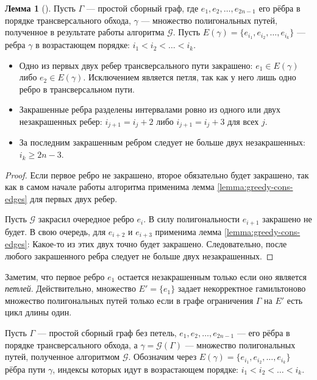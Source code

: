 \documentclass{article}
\theoremstyle{definition}
\newtheorem{lemma}[theorem]{Лемма}
\newcommand{\G}{\mathcal{G}}
\begin{document}
\begin{lemma}[\cite{MaksaevPreprint}]
    Пусть $\Gamma$ — простой сборный граф, где $e_1,e_2,\ldots,e_{2n - 1}$ его рёбра в порядке трансверсального обхода, $\gamma$ — множество полигональных путей, полученное в результате работы алгоритма $\G$. Пусть $E(\gamma) = \{e_{i_1}, e_{i_2},\ldots,e_{i_k}\}$ — ребра $\gamma$ в возрастающем порядке: $i_1 < i_2 <\ldots<i_k$.
    \begin{itemize}
        \item Одно из первых двух ребер трансверсального пути закрашено: $e_1 \in E(\gamma)$ либо $e_2 \in E(\gamma)$. Исключением является петля, так как у него лишь одно ребро в трансверсальном пути.
        \item Закрашенные ребра разделены интервалами ровно из одного или двух незакрашенных ребер: $i_{j + 1} = i_j + 2$ либо $i_{j + 1} = i_j + 3$ для всех $j$.
        \item За последним закрашенным ребром следует не больше двух незакрашенных: $i_k \geq 2n - 3$.
    \end{itemize}
\end{lemma}

\begin{proof}
    Если первое ребро не закрашено, второе обязательно будет закрашено, так как в самом начале работы алгоритма применима лемма \ref{lemma:greedy-cons-edges} для первых двух ребер. 
    
    Пусть $\G$ закрасил очередное ребро $e_i$. В силу полигональности $e_{i + 1}$ закрашено не будет. В свою очередь, для $e_{i + 2}$ и $e_{i + 3}$ применима лемма \ref{lemma:greedy-cons-edges}: Какое-то из этих двух точно будет закрашено. Следовательно, после любого закрашенного ребра следует не больше двух незакрашенных.
\end{proof}

 Заметим, что первое ребро $e_1$ остается незакрашенным только если оно является \emph{петлей}. Действительно, множество $E' = \{e_1\}$ задает некорректное гамильтоново множество полигональных путей только если в графе ограничения $\Gamma$ на $E'$ есть цикл длины один. 

Пусть $\Gamma$ — простой сборный граф без петель, $e_1,e_2,\ldots,e_{2n-1}$ — его рёбра в порядке трансверсального обхода, а $\gamma = \G(\Gamma)$ — множество полигональных путей, полученное алгоритмом $\G$. 
Обозначим через $E(\gamma) = \{e_{i_1}, e_{i_2},\ldots,e_{i_k}\}$ рёбра пути $\gamma$, индексы которых идут в возрастающем порядке: $i_1 < i_2 < \dots < i_k$. 
\end{document}
